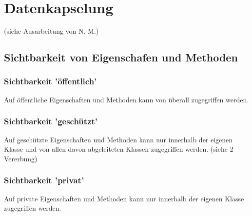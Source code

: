 \section{Datenkapselung}
	
	(siehe Ausarbeitung von N. M.)
	
	\subsection{Sichtbarkeit von Eigenschafen und Methoden}
	
	
	\subsubsection{Sichtbarkeit 'öffentlich'}
		Auf öffentliche Eigenschaften und Methoden kann von überall zugegriffen werden.
		
	\subsubsection{Sichtbarkeit 'geschützt'}
		Auf geschützte Eigenschaften und Methoden kann nur innerhalb der eigenen Klasse und von allen davon abgeleiteten Klassen
		zugegriffen werden. (siehe 2 Vererbung)

	\subsubsection{Sichtbarkeit 'privat'}
		Auf private Eigenschaften und Methoden kann nur innerhalb der eigenen Klasse zugegriffen werden.
